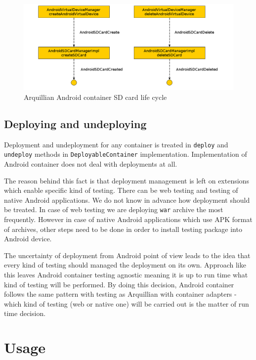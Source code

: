 \documentclass[12pt,final,oneside]{fithesis}
\begin{document}
\begin{figure}[!ht]
	\centering
	\includegraphics[width=120mm]{img/container-sdcards.png}
	\caption{Arquillian Android container SD card life cycle}
	\label{fig:container_sdcard}
\end{figure}
	
		\subsection{Deploying and undeploying}
	
Deployment and undeployment for any container is treated in \texttt{deploy} and \texttt{undeploy} methods in \texttt{DeployableContainer} implementation. Implementation of Android container does not deal with deployments at all.

The reason behind this fact is that deployment management is left on extensions which enable specific kind of testing. There can be web testing and testing of native Android applications. We do not know in advance how deployment should be treated. In case of web testing we are deploying \texttt{war} archive the most frequently. However in case of native Android applications which use APK\cite{bib120} format of archives, other steps need to be done in order to install testing package into Android device.

The uncertainty of deployment from Android point of view leads to the idea that every kind of testing should managed the deployment on its own. Approach like this leaves Android container testing agnostic meaning it is up to run time what kind of testing will be performed. By doing this decision, Android container follows the same pattern with testing as Arquillian with container adapters - which kind of testing (web or native one) will be carried out is the matter of run time decision.
	
	\section{Usage}
\end{document}
